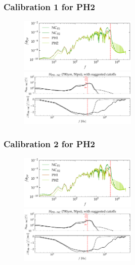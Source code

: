 \documentclass[aspectratio=169,9pt]{beamer}
\begin{document}
\begin{frame}
  \frametitle{Calibration 1 for PH2}
  \begin{figure}
    \centering
    \includegraphics[width=0.5\textwidth]{tf_calib/700_50psi_calib_spec.png}
    \includegraphics[width=0.5\textwidth]{tf_calib/700_50psi_H.pdf}
  \end{figure}
\end{frame}

\begin{frame}
  \frametitle{Calibration 2 for PH2}
  \begin{figure}
    \centering
    \includegraphics[width=0.5\textwidth]{tf_calib/700_50psi_calib_spec_a2.png}
    \includegraphics[width=0.5\textwidth]{tf_calib/700_50psi_H_a2.pdf}
  \end{figure}
\end{frame}
\end{document}
